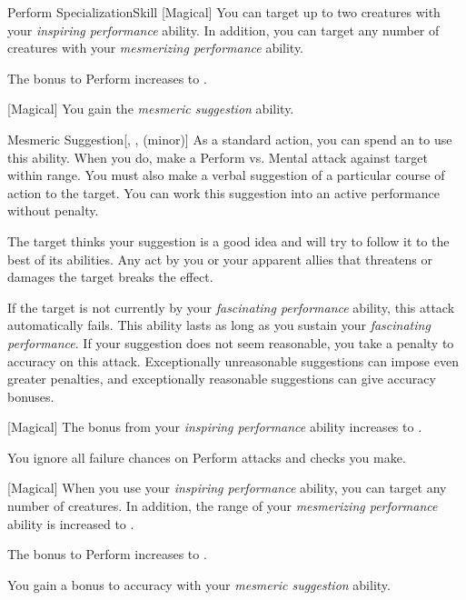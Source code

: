 \begin{feat}{Perform Specialization}{Skill}
        [Magical] You can target up to two creatures with your \textit{inspiring performance} ability.
        In addition, you can target any number of creatures with your \textit{mesmerizing performance} ability.

         The bonus to Perform increases to .

        [Magical] You gain the \textit{mesmeric suggestion} ability.
        \begin{ability}{Mesmeric Suggestion}[, ,  (minor)]
            As a standard action, you can spend an  to use this ability.
            When you do, make a Perform vs. Mental attack against target within \rngmed range.
            You must also make a verbal suggestion of a particular course of action to the target.
            You can work this suggestion into an active performance without penalty.

            \hit The target thinks your suggestion is a good idea and will try to follow it to the best of its abilities.
            Any act by you or your apparent allies that threatens or damages the target breaks the effect.

            If the target is not currently \fascinated by your \textit{fascinating performance} ability, this attack automatically fails.
            This ability lasts as long as you sustain your \textit{fascinating performance}.
            If your suggestion does not seem reasonable, you take a  penalty to accuracy on this attack.
            Exceptionally unreasonable suggestions can impose even greater penalties, and exceptionally reasonable suggestions can give accuracy bonuses.
        \end{ability}

        [Magical] The bonus from your \textit{inspiring performance} ability increases to .

         You ignore all failure chances on Perform attacks and checks you make.

        [Magical] When you use your \textit{inspiring performance} ability, you can target any number of creatures.
        In addition, the range of your \textit{mesmerizing performance} ability is increased to \rnglong.

         The bonus to Perform increases to .

         You gain a  bonus to accuracy with your \textit{mesmeric suggestion} ability.
    \end{feat}

